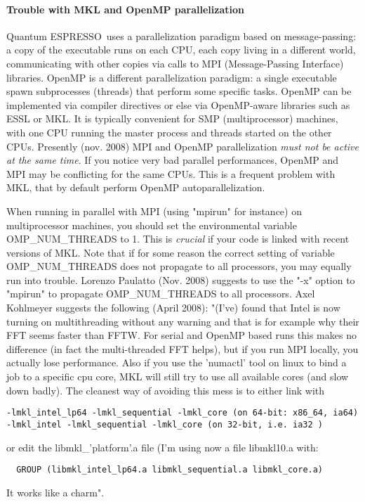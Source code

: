 \documentclass[12pt,a4paper]{article}
\def\qe{{\sc Quantum ESPRESSO}}
\begin{document}
\paragraph{Trouble with MKL and OpenMP parallelization}
\qe\ uses a parallelization paradigm based on message-passing:
a copy of the executable runs on each CPU, each copy living in a different
world, communicating with other copies via calls to MPI
(Message-Passing Interface) libraries. OpenMP is a different
parallelization paradigm: a single executable spawn subprocesses
(threads) that perform some specific tasks. OpenMP can be implemented
via compiler directives or else via OpenMP-aware libraries such as 
ESSL or MKL. It is typically convenient for SMP (multiprocessor)
machines, with one CPU running the master process and threads started
on the other CPUs. Presently (nov. 2008)  MPI and OpenMP parallelization  
{\em must not be active at the same time}. If you notice very bad parallel 
performances, OpenMP and MPI may be conflicting for the same CPUs. This is 
a frequent problem with MKL, that by default perform OpenMP
autoparallelization. 

When running in parallel with MPI (using "mpirun" for instance) on
multiprocessor  machines, you should set the environmental variable
OMP\_NUM\_THREADS to 1. This is {\em crucial} if your code is linked
with recent versions of MKL.  
Note that if for some reason the correct setting  of variable
OMP\_NUM\_THREADS  
does not propagate to all processors, you may equally run into trouble. 
Lorenzo Paulatto (Nov. 2008) suggests to use the "-x" option to "mpirun" to 
propagate OMP\_NUM\_THREADS to all processors.
Axel Kohlmeyer suggests the following (April 2008): 
"(I've) found that Intel is now turning on multithreading without any
warning and that is for example why their FFT seems faster than
FFTW. For serial and OpenMP based runs this makes no difference (in
fact the multi-threaded FFT helps), but if you run MPI locally, you
actually lose performance. Also if you use the 'numactl' tool on linux
to bind a job to a specific cpu core, MKL will still try to use all
available cores (and slow down badly). The cleanest way of avoiding
this mess is to either link with
\begin{verbatim}
-lmkl_intel_lp64 -lmkl_sequential -lmkl_core (on 64-bit: x86_64, ia64)
-lmkl_intel -lmkl_sequential -lmkl_core (on 32-bit, i.e. ia32 )
\end{verbatim}
or edit the libmkl\_'platform'.a file (I'm using now a file libmkl10.a with:
\begin{verbatim}
  GROUP (libmkl_intel_lp64.a libmkl_sequential.a libmkl_core.a)
\end{verbatim}
It works like a charm".
\end{document}
